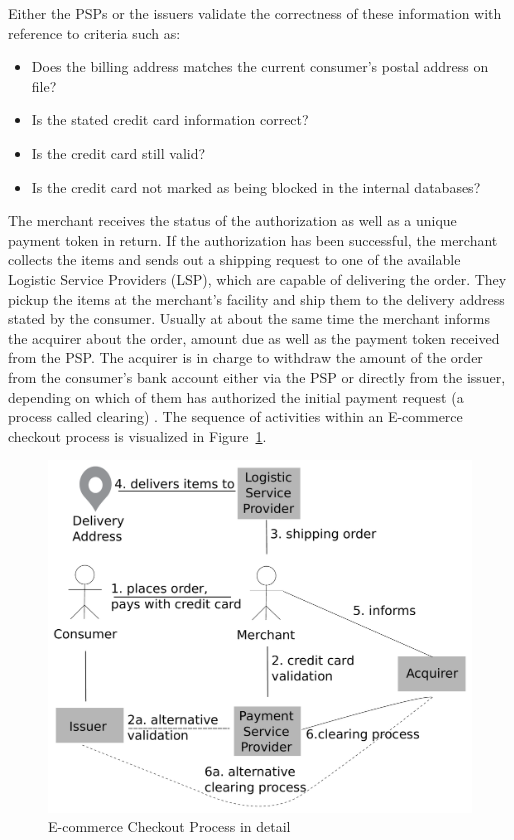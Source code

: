 Either the \gls{PSP}s or the issuers validate the correctness of these information with reference to criteria such as: \@

\begin{itemize}
    \item Does the billing address matches the current consumer's postal address on file?
    \item Is the stated credit card information correct?
    \item Is the credit card still valid?
    \item Is the credit card not marked as being blocked in the internal databases?
\end{itemize}

The merchant receives the status of the authorization as well as a unique payment token in return. If the authorization has been successful, the merchant collects the items and sends out a shipping request to one of the available Logistic Service Providers (\gls{LSP}), which are capable of delivering the order. They pickup the items at the merchant's facility and ship them to the delivery address stated by the consumer. Usually at about the same time the merchant informs the acquirer about the order, amount due as well as the payment token received from the \gls{PSP}. The acquirer is in charge to withdraw the amount of the order from the consumer's bank account either via the \gls{PSP} or directly from the issuer, depending on which of them has authorized the initial payment request (a process called clearing) \citep{VisaPayment2014}. The sequence of activities within an \gls{E-commerce} checkout process is visualized in Figure~\ref{fig:images_ecommerce_checkout_process}.\@

\begin{figure}[!ht]
	\centering
		\includegraphics[width=0.9\columnwidth]{images/e-commerce-checkout-process.pdf}
	\caption{\gls{E-commerce} Checkout Process in detail}
\label{fig:images_ecommerce_checkout_process}
\end{figure}

